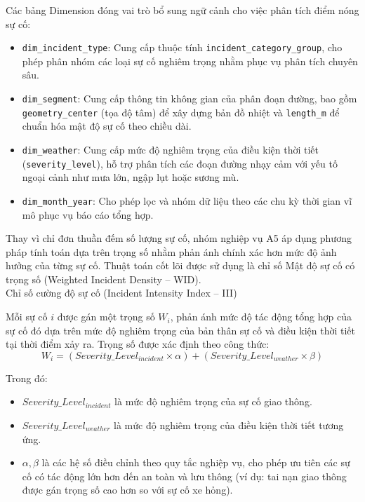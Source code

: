 Các bảng Dimension đóng vai trò bổ sung ngữ cảnh cho việc phân tích điểm nóng sự cố:
\begin{itemize}
    \item \texttt{dim\_incident\_type}: Cung cấp thuộc tính \texttt{incident\_category\_group}, cho phép phân nhóm các loại sự cố nghiêm trọng nhằm phục vụ phân tích chuyên sâu.
    \item \texttt{dim\_segment}: Cung cấp thông tin không gian của phân đoạn đường, bao gồm \texttt{geometry\_center} (tọa độ tâm) để xây dựng bản đồ nhiệt và \texttt{length\_m} để chuẩn hóa mật độ sự cố theo chiều dài.
    \item \texttt{dim\_weather}: Cung cấp mức độ nghiêm trọng của điều kiện thời tiết (\texttt{severity\_level}), hỗ trợ phân tích các đoạn đường nhạy cảm với yếu tố ngoại cảnh như mưa lớn, ngập lụt hoặc sương mù.
    \item \texttt{dim\_month\_year}: Cho phép lọc và nhóm dữ liệu theo các chu kỳ thời gian vĩ mô phục vụ báo cáo tổng hợp.
\end{itemize}


Thay vì chỉ đơn thuần đếm số lượng sự cố, nhóm nghiệp vụ A5 áp dụng phương pháp tính toán dựa trên trọng số nhằm phản ánh chính xác hơn mức độ ảnh hưởng của từng sự cố. Thuật toán cốt lõi được sử dụng là chỉ số Mật độ sự cố có trọng số (Weighted Incident Density -- WID).\\

Chỉ số cường độ sự cố (Incident Intensity Index -- III)

Mỗi sự cố $i$ được gán một trọng số $W_i$, phản ánh mức độ tác động tổng hợp của sự cố đó dựa trên mức độ nghiêm trọng của bản thân sự cố và điều kiện thời tiết tại thời điểm xảy ra. Trọng số được xác định theo công thức:
\[
W_i = (Severity\_Level_{incident} \times \alpha) + (Severity\_Level_{weather} \times \beta)
\]

Trong đó:
\begin{itemize}
    \item $Severity\_Level_{incident}$ là mức độ nghiêm trọng của sự cố giao thông.
    \item $Severity\_Level_{weather}$ là mức độ nghiêm trọng của điều kiện thời tiết tương ứng.
    \item $\alpha, \beta$ là các hệ số điều chỉnh theo quy tắc nghiệp vụ, cho phép ưu tiên các sự cố có tác động lớn hơn đến an toàn và lưu thông (ví dụ: tai nạn giao thông được gán trọng số cao hơn so với sự cố xe hỏng).
\end{itemize}


